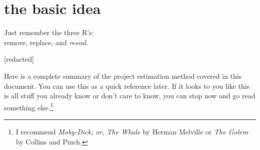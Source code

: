 \documentclass[12pt,oneside]{book}
\begin{document}
\newpage
{}
\section*{the basic idea}

\epigraph{Just remember the three R's: \\ remove, replace, and \emph{reseal}.}{[redacted]}

Here is a complete summary of the project estimation method covered in this document. You can use this as a quick reference later. If it looks to you like this is all stuff you already know or don't care to know, you can stop now and go read something else.\footnote{I recommend \emph{Moby-Dick; or, The Whale} by Herman Melville or \emph{The Golem} by Collins and Pinch.}
\end{document}
